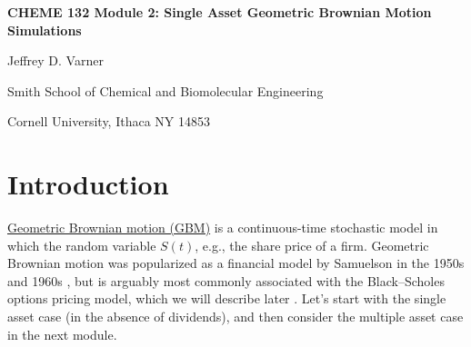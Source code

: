 \documentclass[11pt]{article}
\theoremstyle{definition}
\begin{document}
{\par\centering\textbf{\Large CHEME 132 Module 2: Single Asset Geometric Brownian Motion Simulations}}
\vspace{0.2in}
{\par \centering \large{Jeffrey D. Varner}}
\vspace{0.05in}
{\par \centering \large{Smith School of Chemical and Biomolecular Engineering}}
{\par \centering \large{Cornell University, Ithaca NY 14853}}

\date{}
\thispagestyle{empty}

\setcounter{page}{1}

\section*{Introduction}
\href{https://en.wikipedia.org/wiki/Geometric_Brownian_motion}{Geometric Brownian motion (GBM)} is a continuous-time stochastic model in which the random variable $S(t)$, 
e.g., the share price of a firm. 
Geometric Brownian motion was popularized as a financial model by Samuelson in the 1950s and 1960s \cite{Merton2006}, 
but is arguably most commonly associated with the Black–Scholes options pricing model, which we will describe later 
\cite{BlackScholes1973}. Let's start with the single asset case (in the absence of dividends), 
and then consider the multiple asset case in the next module.
\end{document}
